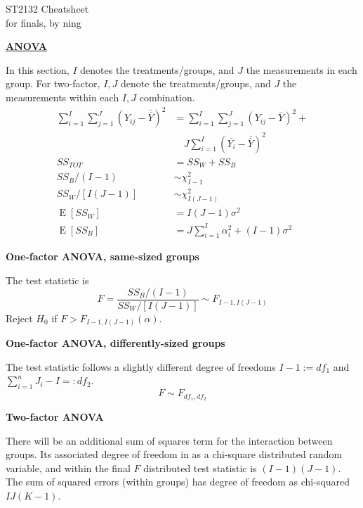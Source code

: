 \documentclass[a4paper]{article}
\newcommand{\heading}[1]{{\small\underline{\textbf{#1}}}\smallskip}
\newcommand{\subheading}[1]{{\scriptsize\textbf{#1}}}
\renewenvironment{section}[1]
  {
    \subheading{#1}

  }{
    \smallskip
  }
\newcommand{\expectation}[1]{\operatorname{E}[#1]}
\begin{document}
\scriptsize                         %
\setlength\parindent{0pt}           %
\setlength{\abovedisplayskip}{3pt}  %
\setlength{\belowdisplayskip}{3pt}  %

\begin{center}
  {\large ST2132 Cheatsheet}\\{for finals, by ning}
\end{center}

\begin{multicols*}{4}

\heading{ANOVA}

In this section, $I$ denotes the treatments/groups, and $J$ the measurements in
each group. For two-factor, $I, J$ denote the treatments/groups, and $J$ the
measurements within each $I, J$ combination.
\begin{align*}
  \sum^I_{i=1}\sum^J_{j=1} (Y_{ij} - \bar{\bar{Y}})^2
    &= \sum^I_{i=1}\sum^J_{j=1} (Y_{ij} - \bar{Y})^2 + \\
    &\quad J\sum^I_{i=1} (\bar{Y_i} - \bar{\bar{Y}})^2 \\
  SS_{TOT} &= SS_W + SS_B \\
  SS_B/(I-1) &\sim \chi^2_{I-1} \\
  SS_W/[I(J-1)] &\sim \chi^2_{I(J-1)} \\
  \expectation{SS_W} &= I(J-1)\sigma^2 \\
  \expectation{SS_B} &= J\sum^I_{i=1} \alpha_i^2 + (I-1)\sigma^2
\end{align*}

\begin{section}{One-factor ANOVA, same-sized groups}
  The test statistic is
  $$F = \frac{SS_B/(I-1)}{SS_W/[I(J-1)]}
    \sim F_{I-1, I(J-1)}$$
  Reject $H_0$ if  $F > F_{I-1, I(J-1)}(\alpha)$.
\end{section}

\begin{section}{One-factor ANOVA, differently-sized groups}
  The test statistic follows a slightly different degree of freedoms $I-1 :=
  df_1$ and $\sum^n_{i=1} J_i - I =: df_2$.
  $$F \sim F_{df_1, df_2}$$
\end{section}

\begin{section}{Two-factor ANOVA}
  There will be an additional sum of squares term for the interaction between
  groups. Its associated degree of freedom in as a chi-square distributed random
  variable, and within the final $F$ distributed test statistic is $(I-1)(J-1)$.
  The sum of squared errors (within groups) has degree of freedom as chi-squared
  $IJ(K-1)$.
\end{section}


\end{multicols*}
\end{document}
